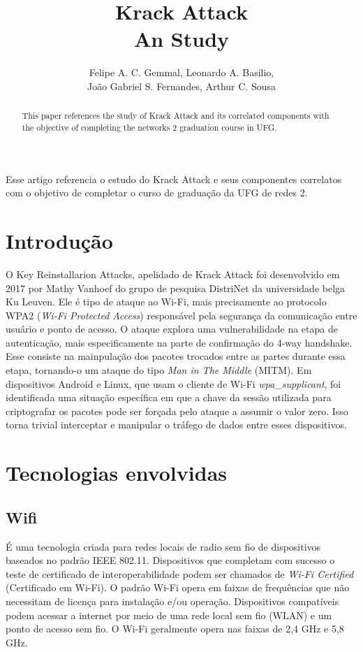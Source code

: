 \documentclass[12pt]{article}
\title{Krack Attack \\ An Study}
\author{Felipe A. C. Gemmal\inst{1}, Leonardo A. Basilio\inst{1},\\ João Gabriel S. Fernandes\inst{1}, Arthur C. Sousa\inst{1} }
\begin{document}
 

\maketitle

\begin{abstract}
	This paper references the study of Krack Attack and its correlated components with the objective of completing the networks 2 graduation course in UFG.
\end{abstract}

\begin{resumo} 
	Esse artigo referencia o estudo do Krack Attack e seus componentes correlatos com o objetivo de completar o curso de graduação da UFG de redes 2.
\end{resumo}


\section{Introdução}
	O Key Reinstallarion Attacks, apelidado de Krack Attack \cite{1} foi desenvolvido em 2017 por Mathy Vanhoef do grupo de pesquisa DistriNet da universidade belga Ku Leuven. Ele é tipo de ataque ao Wi-Fi, mais precisamente ao protocolo WPA2 (\textit{Wi-Fi Protected Access}) responsável pela segurança da comunicação entre usuário e ponto de acesso. O ataque explora uma vulnerabilidade na etapa de autenticação, mais especificamente na parte de  confirmação do 4-way handshake. Esse consiste na mainpulação dos pacotes trocados entre as partes durante essa etapa, tornando-o um ataque do tipo \textit{Man in The Middle} (MITM).
	Em dispositivos Android e Linux, que usam o cliente de Wi-Fi \textit{wpa\_supplicant}, foi identificada uma situação específica em que a chave da sessão utilizada para criptografar os pacotes pode ser forçada pelo ataque a assumir o valor zero. Isso torna trivial interceptar e manipular o tráfego de dados entre esses dispositivos.

\section{Tecnologias envolvidas}
\subsection{Wifi}
É uma tecnologia criada para redes locais de radio sem fio de dispositivos baseados no padrão IEEE 802.11. Dispositivos que completam com sucesso o teste de certificado de interoperabilidade podem ser chamados de \textit{Wi-Fi Certified} (Certificado em Wi-Fi). O padrão Wi-Fi opera em faixas de frequências que não necessitam de licença para instalação e/ou operação. Dispositivos compatíveis podem acessar a internet por meio de uma rede local sem fio (WLAN) e um ponto de acesso sem fio. O Wi-Fi geralmente opera nas faixas de 2,4 GHz e 5,8 GHz.
\end{document}
